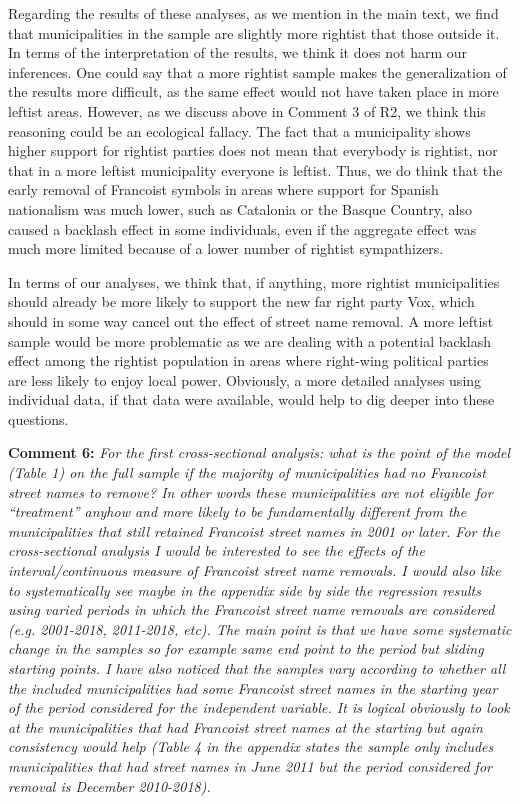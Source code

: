\documentclass[12pt, a4paper, notitlepage]{article}
\begin{document}
Regarding the results of these analyses, as we mention in the main text, we find that municipalities in the sample are slightly more rightist that those outside it. In terms of the interpretation of the results, we think it does not harm our inferences. One could say that a more rightist sample makes the generalization of the results more difficult, as the same effect would not have taken place in more leftist areas. However, as we discuss above in Comment 3 of R2, we think this reasoning could be an ecological fallacy. The fact that a municipality shows higher support for rightist parties does not mean that everybody is rightist, nor that in a more leftist municipality everyone is leftist.
Thus, we do think that the early removal of Francoist symbols in areas where support for Spanish nationalism was much lower, such as Catalonia or the Basque Country, also caused a backlash effect in some individuals, even if the aggregate effect was much more limited because of a lower number of rightist sympathizers.

In terms of our analyses, we think that, if anything, more rightist municipalities should already be more likely to support the new far right party Vox, which should in some way cancel out the effect of street name removal.
A more leftist sample would be more problematic as we are dealing with a potential backlash effect among the rightist population in areas where right-wing political parties are less likely to enjoy local power.
Obviously, a more detailed analyses using individual data, if that data were available, would help to dig deeper into these questions.

\textbf{Comment 6:} \textit{For the first cross-sectional analysis: what is the point of the model (Table 1) on the full sample if the majority of municipalities had no Francoist street names to remove? In other words these municipalities are not eligible for “treatment” anyhow and more likely to be fundamentally different from the municipalities that still retained Francoist street names in 2001 or later.
For the cross-sectional analysis I would be interested to see the effects of the interval/continuous measure of Francoist street name removals. I would also like to systematically see maybe in the appendix side by side the regression results using varied periods in which the Francoist street name removals are considered (e.g. 2001-2018, 2011-2018, etc). The main point is that we have some systematic change in the samples so for example same end point to the period but sliding starting points. I have also noticed that the samples vary according to whether all the included municipalities had some Francoist street names in the starting year of the period considered for the independent variable. It is logical obviously to look at the municipalities that had Francoist street names at the starting but again consistency would help (Table 4 in the appendix states the sample only includes municipalities that had street names in June 2011 but the period considered for removal is December 2010-2018).}
\end{document}
